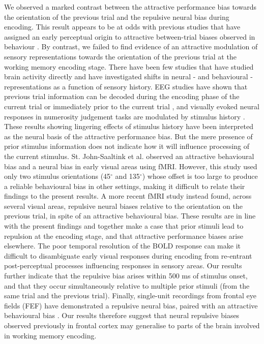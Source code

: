 \documentclass{article}
\begin{document}
We observed a marked contrast between the attractive performance bias towards the orientation of the previous trial and the repulsive neural bias during encoding. This result appears to be at odds with previous studies that have assigned an early perceptual origin to attractive between-trial biases observed in behaviour \parencite[e.g., ][]{Fischer2014, Cicchini2017, Cicchini2018}. By contrast, we failed to find evidence of an attractive modulation of sensory representations towards the orientation of the previous trial at the working memory encoding stage. There have been few studies that have studied brain activity directly and have investigated shifts in neural - and behavioural - representations as a function of sensory history. EEG studies have shown that previous trial information can be decoded during the encoding phase of the current trial \parencite{Bae2019} or immediately prior to the current trial \parencite{Barbosa2020}, and visually evoked neural responses in numerosity judgement tasks are modulated by stimulus history \parencite{Fornaciai2018, Fornaciai2019}. These results showing lingering effects of stimulus history have been interpreted as the neural basis of the attractive performance bias. But the mere presence of prior stimulus information does not indicate how it will influence processing of the current stimulus. St. John-Saaltink et al. \citeyear{StJohn-Saaltink2016} observed an attractive behavioural bias and a neural bias in early visual areas using fMRI. However, this study used only two stimulus orientations (45$^{\circ}$ and 135$^{\circ}$) whose offset is too large to produce a reliable behavioural bias in other settings, making it difficult to relate their findings to the present results. A more recent fMRI study \parencite{Sheehan2021} instead found, across several visual areas, repulsive neural biases relative to the orientation on the previous trial, in spite of an attractive behavioural bias. These results are in line with the present findings and together make a case that prior stimuli lead to repulsion at the encoding stage, and that attractive performance biases arise elsewhere. The poor temporal resolution of the BOLD response can make it difficult to disambiguate early visual responses during encoding from re-entrant post-perceptual processes influencing responses in sensory areas. Our results further indicate that the repulsive bias arises within 500 ms of stimulus onset, and that they occur simultaneously relative to multiple prior stimuli (from the same trial and the previous trial). Finally, single-unit recordings from frontal eye fields (FEF) have demonstrated a repulsive neural bias, paired with an attractive behavioural bias \parencite{Papadimitriou2017}. Our results therefore suggest that neural repulsive biases observed previously in frontal cortex may generalise to parts of the brain involved in working memory encoding.
\end{document}
